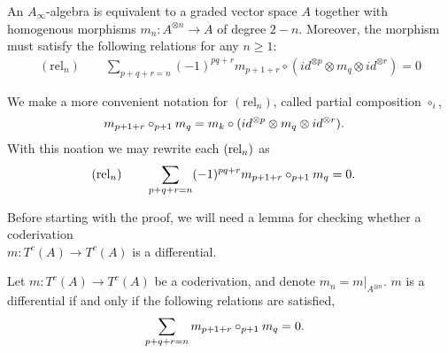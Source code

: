 \documentclass[../thesis.tex]{subfiles}
\begin{document}
        \begin{proposition}\label{prop: A-infinity def}
            An $A_\infty$-algebra is equivalent to a graded vector space $A$ together with homogenous morphisms $m_n: A^{\otimes n}\rightarrow A$ of degree $2-n$. Moreover, the morphism must satisfy the following relations for any $n\geq 1$:
            \begin{align*}
                (\text{rel}_n)\qquad \sum_{p+q+r = n}(-1)^{pq+r}m_{p+1+r}\circ (id^{\otimes p}\otimes m_q \otimes id^{\otimes r}) = 0
            \end{align*}
        \end{proposition}

        \begin{remark}
            We make a more convenient notation for $(\text{rel}_n)$, called partial composition $\circ_i$,
            \begin{align*}
                & m_{p+1+r} \circ_{p+1} m_q = m_k \circ (id^{\otimes p}\otimes m_q \otimes id^{\otimes r})\tt{.}
            \end{align*}
            With this noation we may rewrite each $(\tt{rel}_n)$ as
            \begin{align*}
                (\text{rel}_n)\qquad & \sum_{p+q+r = n} (-1)^{pq+r} m_{p+1+r} \circ_{p+1} m_q = 0\tt{.}
            \end{align*}
        \end{remark}

        Before starting with the proof, we will need a lemma for checking whether a coderivation \\ $m: T^c(A) \rightarrow T^c(A)$ is a differential.

        \begin{lemma}\label{lem: coderivation-is-diff?}
            Let $m: T^c(A) \rightarrow T^c(A)$ be a coderivation, and denote $m_n = m|_{A^{\otimes n}}$. $m$ is a differential if and only if the following relations are satisfied,
            \begin{align*}
                & \sum_{p+q+r = n}m_{p+1+r}\circ_{p+1}m_q = 0\tt{.}
            \end{align*}
        \end{lemma}
\end{document}
